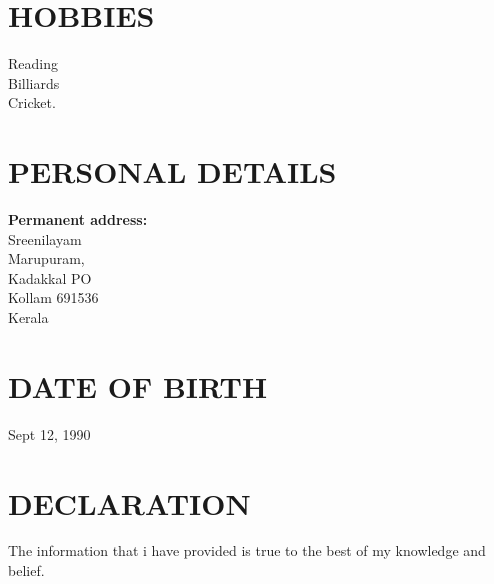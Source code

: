 \documentclass[line,margin]{res}
\begin{document}
\begin{resume}
\section{HOBBIES}
	
        Reading \\ 
        Billiards \\ 
        Cricket.  \\ 
       
\section{PERSONAL DETAILS}
 {\bf Permanent address:} 		 \\
	Sreenilayam \\
	Marupuram, \\
	Kadakkal PO \\
	Kollam 691536 \\
	Kerala        \\    
	
\section{DATE OF BIRTH } 
	Sept 12, 1990 
 
\section{DECLARATION} 
	The information that i have provided is true to the best of my knowledge and belief. 	
	
\end{resume}
\end{document}
